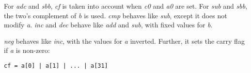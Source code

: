\documentclass[a4paper,11pt]{kth-mag}
\begin{document}
For \emph{adc} and \emph{sbb}, \emph{cf} is taken into account when \emph{c0} and \emph{a0} are set.
For \emph{sub} and \emph{sbb}, the two's complement of \emph{b} is used.
\emph{cmp} behaves like \emph{sub}, except it does not modify \emph{a}.
\emph{inc} and \emph{dec} behave like \emph{add} and \emph{sub}, with fixed values for \emph{b}.

\emph{neg} behaves like \emph{inc}, with the values for \emph{a} inverted.
Further, it sets the carry flag if \emph{a} is non-zero:

\begin{verbatim}
cf = a[0] | a[1] | ... | a[31]
\end{verbatim}



\end{document}

